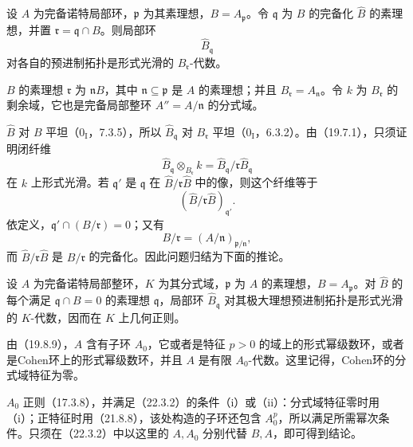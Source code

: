 设 $A$ 为完备诺特局部环，$\mathfrak p$ 为其素理想，$B=A_{\mathfrak p}$。令 $\mathfrak q$ 为 $B$ 的完备化 $\widehat B$ 的素理想，并置 $\mathfrak r=\mathfrak q\cap B$。则局部环
\[
 \widehat B_{\mathfrak q}
\]
对各自的预进制拓扑是形式光滑的 $B_{\mathfrak r}$-代数。

\eproof
$B$ 的素理想 $\mathfrak r$ 为 $\mathfrak nB$，其中 $\mathfrak n\subseteq\mathfrak p$ 是 $A$ 的素理想；并且 $B_{\mathfrak r}=A_{\mathfrak n}$。令 $k$ 为 $B_{\mathfrak r}$ 的剩余域，它也是完备局部整环 $A''=A/\mathfrak n$ 的分式域。

$\widehat B$ 对 $B$ 平坦（$0_{\mathrm I}$，7.3.5），所以 $\widehat B_{\mathfrak q}$ 对 $B_{\mathfrak r}$ 平坦（$0_{\mathrm I}$，6.3.2）。由（19.7.1），只须证明闭纤维
\[
 \widehat B_{\mathfrak q}\otimes_{B_{\mathfrak r}}k
 =\widehat B_{\mathfrak q}/\mathfrak r\widehat B_{\mathfrak q}
\]
在 $k$ 上形式光滑。若 $\mathfrak q'$ 是 $\mathfrak q$ 在 $\widehat B/\mathfrak r\widehat B$ 中的像，则这个纤维等于
\[
 (\widehat B/\mathfrak r\widehat B)_{\mathfrak q'}.
\]
依定义，$\mathfrak q'\cap(B/\mathfrak r)=0$；又有
\[
 B/\mathfrak r=(A/\mathfrak n)_{\mathfrak p/\mathfrak n},
\]
而 $\widehat B/\mathfrak r\widehat B$ 是 $B/\mathfrak r$ 的完备化。因此问题归结为下面的推论。
\finishproof

设 $A$ 为完备诺特局部整环，$K$ 为其分式域，$\mathfrak p$ 为 $A$ 的素理想，$B=A_{\mathfrak p}$。对 $\widehat B$ 的每个满足 $\mathfrak q\cap B=0$ 的素理想 $\mathfrak q$，局部环 $\widehat B_{\mathfrak q}$ 对其极大理想预进制拓扑是形式光滑的 $K$-代数，因而在 $K$ 上几何正则。

\eproof
由（19.8.9），$A$ 含有子环 $A_0$，它或者是特征 $p>0$ 的域上的形式幂级数环，或者是Cohen环上的形式幂级数环，并且 $A$ 是有限 $A_0$-代数。这里记得，Cohen环的分式域特征为零。

$A_0$ 正则（17.3.8），并满足（22.3.2）的条件（i）或（ii）：分式域特征零时用（i）；正特征时用（21.8.8），该处构造的子环还包含 $A_0^p$，所以满足所需幂次条件。只须在（22.3.2）中以这里的 $A,A_0$ 分别代替 $B,A$，即可得到结论。
\finishproof
